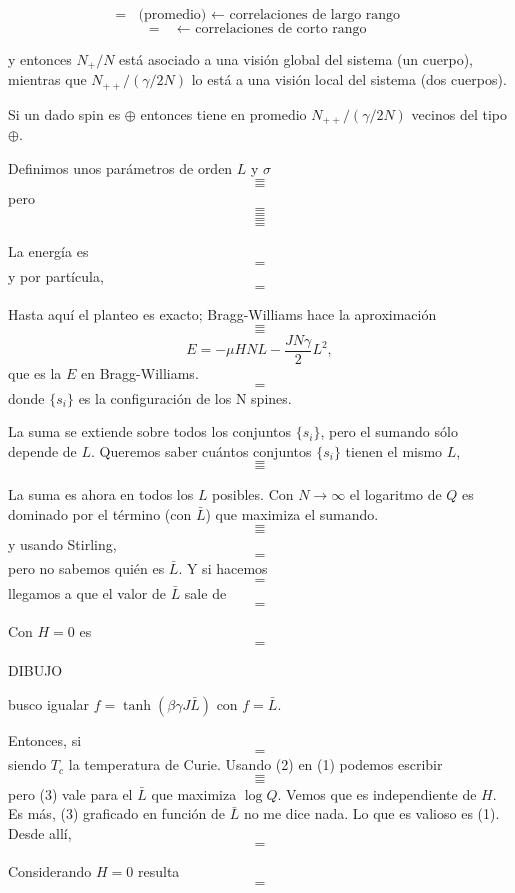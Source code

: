 \documentclass[10pt,oneside]{CBFT_book}
\begin{document}
\[= \text{ (promedio) $\leftarrow$ correlaciones de largo rango } \]
\[= \text{  $\leftarrow$ correlaciones de corto rango } \]

y entonces $N_{+}/N$ está asociado a una visión global del sistema (un cuerpo), mientras que $N_{++}/(\gamma/2 N)$ 
lo está a una visión local del sistema (dos cuerpos).

Si un dado spin es $\oplus$ entonces tiene en promedio $N_{++}/(\gamma/2 N)$ vecinos del tipo $\oplus$.

Definimos unos parámetros de orden $L$ y $\sigma$
\[=\]
\[=\]
pero 
\[=\]
\[=\]
\[=\]
\[=\]

La energía es 
\[=\]
y por partícula,
\[=\]

Hasta aquí el planteo es exacto; Bragg-Williams hace la aproximación
\[=\]
\[=\]
\[ 
	\boxed{ E = -\mu H N L - \frac{JN\gamma }{2}L^2 },
\]
que es la $E$ en Bragg-Williams.
\[=\]
donde $\{ s_i\}$ es la configuración de los N spines.

La suma se extiende sobre todos los conjuntos $\{ s_i\}$, pero el sumando sólo depende de $L$.
Queremos saber cuántos conjuntos $\{ s_i\}$ tienen el mismo $L$,
\[=\]
\[=\]

La suma es ahora en todos los $L$ posibles. Con $N\to\infty$ el logaritmo de $Q$ es dominado por el término
(con $\bar{L}$) que maximiza el sumando.
\[=\]
\[=\]
y usando Stirling,
\[=\]
pero no sabemos quién es $\bar{L}$. Y si hacemos
\[=\]
llegamos a que el valor de $\bar{L}$ sale de
\[=\]

Con $H=0$ es 
\[=\]

DIBUJO 

busco igualar $f=\tanh(\beta\gamma J\bar{L})$ con $f=\bar{L}$.

Entonces, si
\[=\]
siendo $T_c$ la temperatura de Curie.
Usando (2) en (1) podemos escribir 
\[=\]
\[=\]
pero (3) vale para el $\bar{L}$ que maximiza $\log Q$. Vemos que es independiente de $H$.
Es más, (3) graficado en función de $\bar{L}$ no me dice nada. Lo que es valioso es (1).
Desde allí,
\[=\]

Considerando $H=0$ resulta
\[=\]
\end{document}
